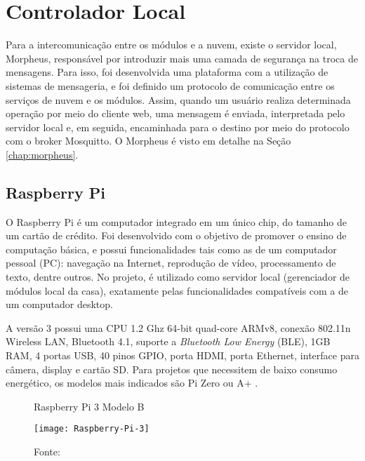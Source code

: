 \section{Controlador Local}
Para a intercomunicação entre os módulos e a nuvem, existe o servidor local, Morpheus, responsável por introduzir mais uma camada de segurança na troca de mensagens. Para isso, foi desenvolvida uma plataforma com a utilização de sistemas de mensageria, e foi definido um protocolo de comunicação entre os serviços de nuvem e os módulos. Assim, quando um usuário realiza determinada operação por meio do cliente web, uma mensagem é enviada, interpretada pelo servidor local e, em seguida, encaminhada para o destino por meio do protocolo \wmqtt{} com o broker Mosquitto. O Morpheus é visto em detalhe na Seção \ref{chap:morpheus}.

\subsection{Raspberry Pi}
O Raspberry Pi é um computador integrado em um único chip, do tamanho de um cartão de crédito. Foi desenvolvido com o objetivo de promover o ensino de computação básica, e possui funcionalidades tais como as de um computador pessoal (PC): navegação na Internet, reprodução de vídeo, processamento de texto, dentre outros. No projeto, é utilizado como servidor local (gerenciador de módulos local da casa), exatamente pelas funcionalidades compatíveis com a de um computador desktop.

A versão 3 possui uma CPU 1.2 Ghz 64-bit quad-core ARMv8, conexão 802.11n Wireless LAN, Bluetooth 4.1, suporte a \emph{Bluetooth Low Energy} (BLE), 1GB RAM, 4 portas USB, 40 pinos GPIO, porta HDMI, porta Ethernet, interface para câmera, display e cartão SD. Para projetos que necessitem de baixo consumo energético, os modelos mais indicados são Pi Zero ou A+ \cite{raspPi}.

\begin{figure}[H]
	\centering
	\caption{Raspberry Pi 3 Modelo B}
  \texttt{[image: Raspberry-Pi-3]}
	\caption*{Fonte: \cite{raspPi}}
\label{fig:Raspberry-Pi-3}
\end{figure}
